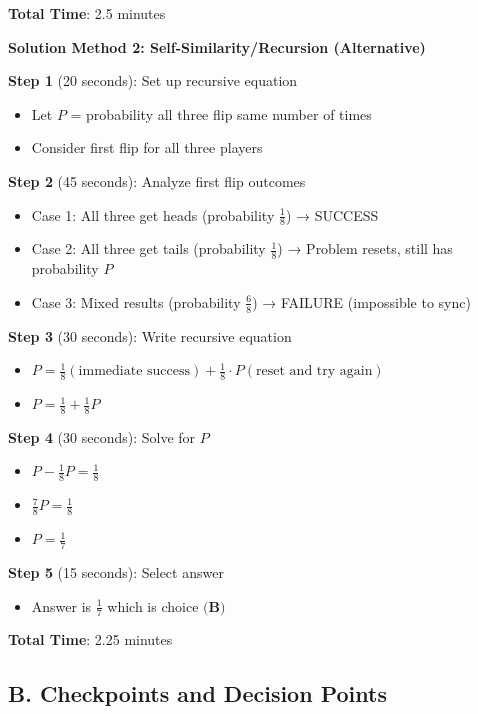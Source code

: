\documentclass[11pt]{article}
\begin{document}
\begin{roadmapbox}
\textbf{Total Time}: 2.5 minutes

\vspace{1em}

\textbf{Solution Method 2: Self-Similarity/Recursion (Alternative)}

\textbf{Step 1} (20 seconds): Set up recursive equation
\begin{itemize}
    \item Let $P$ = probability all three flip same number of times
    \item Consider first flip for all three players
\end{itemize}

\textbf{Step 2} (45 seconds): Analyze first flip outcomes
\begin{itemize}
    \item Case 1: All three get heads (probability $\frac{1}{8}$) → SUCCESS
    \item Case 2: All three get tails (probability $\frac{1}{8}$) → Problem resets, still has probability $P$
    \item Case 3: Mixed results (probability $\frac{6}{8}$) → FAILURE (impossible to sync)
\end{itemize}

\textbf{Step 3} (30 seconds): Write recursive equation
\begin{itemize}
    \item $P = \frac{1}{8}(\text{immediate success}) + \frac{1}{8} \cdot P(\text{reset and try again})$
    \item $P = \frac{1}{8} + \frac{1}{8}P$
\end{itemize}

\textbf{Step 4} (30 seconds): Solve for $P$
\begin{itemize}
    \item $P - \frac{1}{8}P = \frac{1}{8}$
    \item $\frac{7}{8}P = \frac{1}{8}$
    \item $P = \frac{1}{7}$
\end{itemize}

\textbf{Step 5} (15 seconds): Select answer
\begin{itemize}
    \item Answer is $\boxed{\frac{1}{7}}$ which is choice $\textbf{(B)}$
\end{itemize}

\textbf{Total Time}: 2.25 minutes

\subsection*{B. Checkpoints and Decision Points}


\end{roadmapbox}
\end{document}
